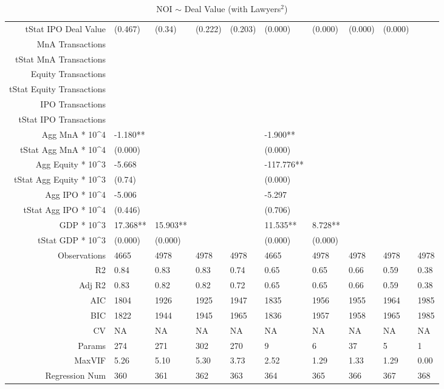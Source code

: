 \begin{table}[ht]
\begin{tabular}{rlllllllll}
  tStat IPO Deal Value & (0.467) & (0.34) & (0.222) & (0.203) & (0.000) & (0.000) & (0.000) & (0.000) &  \\ 
  MnA Transactions &  &  &  &  &  &  &  &  &  \\ 
  tStat MnA Transactions &  &  &  &  &  &  &  &  &  \\ 
  Equity Transactions &  &  &  &  &  &  &  &  &  \\ 
  tStat Equity Transactions &  &  &  &  &  &  &  &  &  \\ 
  IPO Transactions &  &  &  &  &  &  &  &  &  \\ 
  tStat IPO Transactions &  &  &  &  &  &  &  &  &  \\ 
  Agg MnA * 10^4 & -1.180** &  &  &  & -1.900** &  &  &  &  \\ 
  tStat Agg MnA * 10^4 & (0.000) &  &  &  & (0.000) &  &  &  &  \\ 
  Agg Equity * 10^3 & -5.668 &  &  &  & -117.776** &  &  &  &  \\ 
  tStat Agg Equity * 10^3 & (0.74) &  &  &  & (0.000) &  &  &  &  \\ 
  Agg IPO * 10^4 & -5.006 &  &  &  & -5.297 &  &  &  &  \\ 
  tStat Agg IPO * 10^4 & (0.446) &  &  &  & (0.706) &  &  &  &  \\ 
  GDP * 10^3 & 17.368** & 15.903** &  &  & 11.535** & 8.728** &  &  &  \\ 
  tStat GDP * 10^3 & (0.000) & (0.000) &  &  & (0.000) & (0.000) &  &  &  \\ 
  Observations & 4665 & 4978 & 4978 & 4978 & 4665 & 4978 & 4978 & 4978 & 4978 \\ 
  R2 & 0.84 & 0.83 & 0.83 & 0.74 & 0.65 & 0.65 & 0.66 & 0.59 & 0.38 \\ 
  Adj R2 & 0.83 & 0.82 & 0.82 & 0.72 & 0.65 & 0.65 & 0.66 & 0.59 & 0.38 \\ 
  AIC & 1804 & 1926 & 1925 & 1947 & 1835 & 1956 & 1955 & 1964 & 1985 \\ 
  BIC & 1822 & 1944 & 1945 & 1965 & 1836 & 1957 & 1958 & 1965 & 1985 \\ 
  CV & NA & NA & NA & NA & NA & NA & NA & NA & NA \\ 
  Params & 274 & 271 & 302 & 270 & 9 & 6 & 37 & 5 & 1 \\ 
  MaxVIF & 5.26 & 5.10 & 5.30 & 3.73 & 2.52 & 1.29 & 1.33 & 1.29 & 0.00 \\ 
  Regression Num & 360 & 361 & 362 & 363 & 364 & 365 & 366 & 367 & 368 \\ 
   \hline
\end{tabular}
\caption{NOI $\sim$ Deal Value (with Lawyers$^2$)} 
\end{table}
